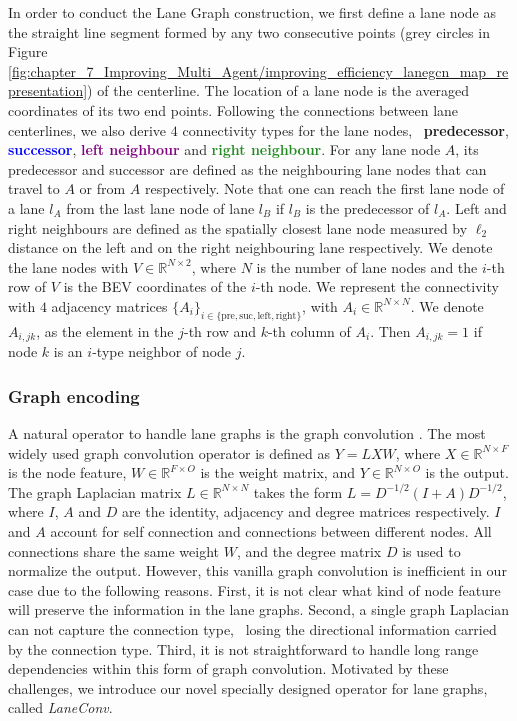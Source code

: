 In order to conduct the Lane Graph construction, we first define a lane node as the straight line segment formed by any two consecutive points (grey circles in Figure \ref{fig:chapter_7_Improving_Multi_Agent/improving_efficiency_lanegcn_map_representation}) of the centerline. The location of a lane node is the averaged coordinates of its two end points. Following the  connections between lane centerlines, we also derive $4$ connectivity types for the lane nodes, \ie \ \textbf{\textcolor{YellowOrange}{predecessor}}, \textbf{\textcolor{blue}{successor}}, \textbf{\textcolor{purple}{left neighbour}} and \textbf{\textcolor{ForestGreen}{right neighbour}}. For any lane node $A$, its predecessor and successor are defined as the neighbouring lane nodes that can travel to $A$ or from $A$ respectively. Note that one can reach the first lane node of a lane $l_{A}$ from the last lane node of lane $l_{B}$ if $l_{B}$ is the predecessor of $l_{A}$. Left and right neighbours are defined as the spatially closest lane node measured by $\ell_2$ distance on the left and on the right neighbouring lane respectively. We denote the lane nodes with $V \in \mathbb{R}^{N \times 2}$, where $N$ is the number of lane nodes and the $i$-th row of $V$ is the BEV coordinates of the $i$-th node. We represent the connectivity with $4$ adjacency matrices $\{A_i\}_{ i \in \{\text{pre}, \text{suc}, \text{left}, \text{right}\} }$, with $A_i \in \mathbb{R}^{N \times N}$. We denote $A_{i, jk}$, as the element in the $j$-th row and $k$-th column of $A_i$. Then  $A_{i, jk} = 1$ if node $k$ is an $i$-type neighbor of node $j$. 

\subsubsection{Graph encoding}
\label{subsubsec:7_improving_efficiency_graph_encoding}

A natural operator to handle lane graphs is the graph convolution \cite{shuman2013emerging}.
The most widely used graph convolution operator \cite{kipf2016semi} is defined as $Y = LXW$, where $X \in \mathbb{R}^{N \times F}$ is the node feature, $W \in \mathbb{R}^{F \times O}$ is the weight matrix, and $Y \in \mathbb{R}^{N \times O}$ is the output. The graph Laplacian matrix $L \in \mathbb{R}^{N \times N}$ takes the form $L = D^{-1/2}(I + A)D^{-1/2}$, where $I$, $A$ and $D$ are the identity, adjacency and degree matrices respectively. $I$ and $A$ account for self connection and connections between different nodes. All connections share the same weight $W$, and the degree matrix $D$ is used to normalize the output. However, this vanilla graph convolution is inefficient in our case due to the following reasons. First, it is not clear what kind of node feature will preserve the information in the lane graphs. Second, a single graph Laplacian can not capture the connection type, \ie \ losing the directional information carried by the connection type. Third, it is not straightforward to handle long range dependencies within this form of graph convolution. Motivated by these challenges, we introduce our novel specially designed operator for lane graphs, called \textit{LaneConv}.


